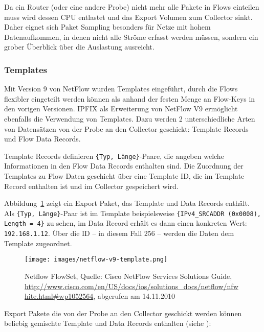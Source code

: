 Da ein Router (oder eine andere Probe) nicht mehr alle Pakete in Flows einteilen
muss wird dessen CPU entlastet und das Export Volumen zum Collector sinkt. Daher
eignet sich Paket Sampling besonders für Netze mit hohem Datenaufkommen, in
denen nicht alle Ströme erfasst werden müssen, sondern ein grober Überblick über
die Auslastung ausreicht.

\subsubsection{Templates}

Mit Version 9 von NetFlow wurden Templates eingeführt, durch die Flows flexibler
eingeteilt werden können als anhand der festen Menge an Flow-Keys in den vorigen
Versionen. IPFIX als Erweiterung von NetFlow V9 ermöglicht ebenfalls die
Verwendung von Templates. Dazu werden 2 unterschiedliche Arten von Datensätzen
von der Probe an den Collector geschickt: Template Records und Flow Data
Records.

Template Records definieren \texttt{\{Typ, Länge\}}-Paare, die angeben
welche Informationen in den Flow Data Records enthalten sind. Die Zuordnung der
Templates zu Flow Daten geschieht über eine Template ID, die im Template Record
enthalten ist und im Collector gespeichert wird.

Abbildung~\ref{fig:compositions:netflow-template} zeigt ein Export Paket, das
Template und Data Records enthält. Als \texttt{\{Typ, Länge\}}-Paar ist im
Template beispielsweise \texttt{\{IPv4\_SRCADDR (0x0008), Length = 4\}} zu
sehen, im Data Record erhält es dann einen konkreten Wert:
\texttt{192.168.1.12}. Über die ID -- in diesem Fall 256 -- werden die Daten dem
Template zugeordnet.

\begin{figure}
  \begin{center}
    \texttt{[image: images/netflow-v9-template.png]}
    \caption[Netflow FlowSet]{Netflow FlowSet, Quelle: Cisco NetFlow Services Solutions Guide,
    \url{http://www.cisco.com/en/US/docs/ios/solutions_docs/netflow/nfwhite.html\#wp1052564}, abgerufen am 14.11.2010}
    \label{fig:compositions:netflow-template}
  \end{center}
\end{figure}

Export Pakete die von der Probe an den Collector geschickt werden können
beliebig gemischte Template und Data Records enthalten
(siehe \cite[7, 8]{rfc-3954}):

